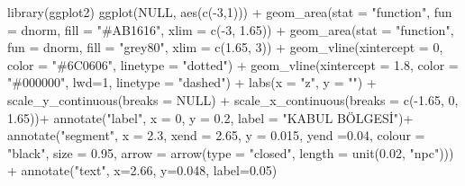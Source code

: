 \documentclass[
  12pt,
]{book}
\newenvironment{Shaded}{\begin{snugshade}}{\end{snugshade}}
\newcommand{\AttributeTok}[1]{\textcolor[rgb]{0.77,0.63,0.00}{#1}}
\newcommand{\ConstantTok}[1]{\textcolor[rgb]{0.00,0.00,0.00}{#1}}
\newcommand{\DecValTok}[1]{\textcolor[rgb]{0.00,0.00,0.81}{#1}}
\newcommand{\FloatTok}[1]{\textcolor[rgb]{0.00,0.00,0.81}{#1}}
\newcommand{\FunctionTok}[1]{\textcolor[rgb]{0.00,0.00,0.00}{#1}}
\newcommand{\NormalTok}[1]{#1}
\newcommand{\SpecialCharTok}[1]{\textcolor[rgb]{0.00,0.00,0.00}{#1}}
\newcommand{\StringTok}[1]{\textcolor[rgb]{0.31,0.60,0.02}{#1}}
\begin{document}
\begin{Shaded}
\begin{Highlighting}[]
\FunctionTok{library}\NormalTok{(ggplot2)}
\FunctionTok{ggplot}\NormalTok{(}\ConstantTok{NULL}\NormalTok{, }\FunctionTok{aes}\NormalTok{(}\FunctionTok{c}\NormalTok{(}\SpecialCharTok{{-}}\DecValTok{3}\NormalTok{,}\DecValTok{1}\NormalTok{))) }\SpecialCharTok{+}
  \FunctionTok{geom\_area}\NormalTok{(}\AttributeTok{stat =} \StringTok{"function"}\NormalTok{, }\AttributeTok{fun =}\NormalTok{ dnorm, }\AttributeTok{fill =} \StringTok{"\#AB1616"}\NormalTok{, }\AttributeTok{xlim =} \FunctionTok{c}\NormalTok{(}\SpecialCharTok{{-}}\DecValTok{3}\NormalTok{, }\FloatTok{1.65}\NormalTok{)) }\SpecialCharTok{+}
  \FunctionTok{geom\_area}\NormalTok{(}\AttributeTok{stat =} \StringTok{"function"}\NormalTok{, }\AttributeTok{fun =}\NormalTok{ dnorm, }\AttributeTok{fill =} \StringTok{"grey80"}\NormalTok{, }\AttributeTok{xlim =} \FunctionTok{c}\NormalTok{(}\FloatTok{1.65}\NormalTok{, }\DecValTok{3}\NormalTok{)) }\SpecialCharTok{+}
  \FunctionTok{geom\_vline}\NormalTok{(}\AttributeTok{xintercept =} \DecValTok{0}\NormalTok{, }\AttributeTok{color =} \StringTok{"\#6C0606"}\NormalTok{, }\AttributeTok{linetype =} \StringTok{"dotted"}\NormalTok{) }\SpecialCharTok{+}
  \FunctionTok{geom\_vline}\NormalTok{(}\AttributeTok{xintercept =} \FloatTok{1.8}\NormalTok{, }\AttributeTok{color =} \StringTok{"\#000000"}\NormalTok{, }\AttributeTok{lwd=}\DecValTok{1}\NormalTok{, }\AttributeTok{linetype =} \StringTok{"dashed"}\NormalTok{) }\SpecialCharTok{+}
  \FunctionTok{labs}\NormalTok{(}\AttributeTok{x =} \StringTok{"z"}\NormalTok{, }\AttributeTok{y =} \StringTok{""}\NormalTok{) }\SpecialCharTok{+}
  \FunctionTok{scale\_y\_continuous}\NormalTok{(}\AttributeTok{breaks =} \ConstantTok{NULL}\NormalTok{) }\SpecialCharTok{+}
  \FunctionTok{scale\_x\_continuous}\NormalTok{(}\AttributeTok{breaks =} \FunctionTok{c}\NormalTok{(}\SpecialCharTok{{-}}\FloatTok{1.65}\NormalTok{, }\DecValTok{0}\NormalTok{, }\FloatTok{1.65}\NormalTok{))}\SpecialCharTok{+}
  \FunctionTok{annotate}\NormalTok{(}\StringTok{"label"}\NormalTok{, }\AttributeTok{x =} \DecValTok{0}\NormalTok{, }\AttributeTok{y =} \FloatTok{0.2}\NormalTok{, }\AttributeTok{label =} \StringTok{"KABUL BÖLGESİ"}\NormalTok{)}\SpecialCharTok{+}
  \FunctionTok{annotate}\NormalTok{(}\StringTok{"segment"}\NormalTok{, }\AttributeTok{x =} \FloatTok{2.3}\NormalTok{, }\AttributeTok{xend =} \FloatTok{2.65}\NormalTok{, }\AttributeTok{y =} \FloatTok{0.015}\NormalTok{, }\AttributeTok{yend =}\FloatTok{0.04}\NormalTok{,}
           \AttributeTok{colour =} \StringTok{"black"}\NormalTok{, }\AttributeTok{size =} \FloatTok{0.95}\NormalTok{, }\AttributeTok{arrow =} \FunctionTok{arrow}\NormalTok{(}\AttributeTok{type =} \StringTok{"closed"}\NormalTok{, }\AttributeTok{length =} \FunctionTok{unit}\NormalTok{(}\FloatTok{0.02}\NormalTok{, }\StringTok{"npc"}\NormalTok{))) }\SpecialCharTok{+}
  \FunctionTok{annotate}\NormalTok{(}\StringTok{"text"}\NormalTok{, }\AttributeTok{x=}\FloatTok{2.66}\NormalTok{, }\AttributeTok{y=}\FloatTok{0.048}\NormalTok{, }\AttributeTok{label=}\StringTok{\textquotesingle{}0.05\textquotesingle{}}\NormalTok{)}
\end{Highlighting}
\end{Shaded}
\end{document}
